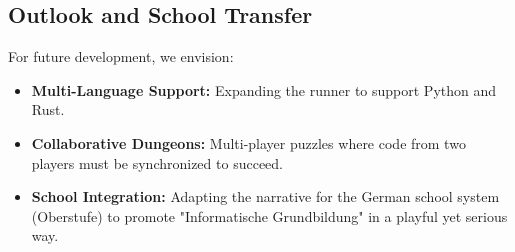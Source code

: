 \documentclass[a4paper, UKenglish, cleveref, autoref, thm-restate]{oasics-v2021}
\begin{document}
\subsection{Outlook and School Transfer}
For future development, we envision:
\begin{itemize}
    \item \textbf{Multi-Language Support:} Expanding the runner to support Python and Rust.
    \item \textbf{Collaborative Dungeons:} Multi-player puzzles where code from two players must be synchronized to succeed.
    \item \textbf{School Integration:} Adapting the narrative for the German school system (Oberstufe) to promote "Informatische Grundbildung" in a playful yet serious way.
\end{itemize}


\end{document}
